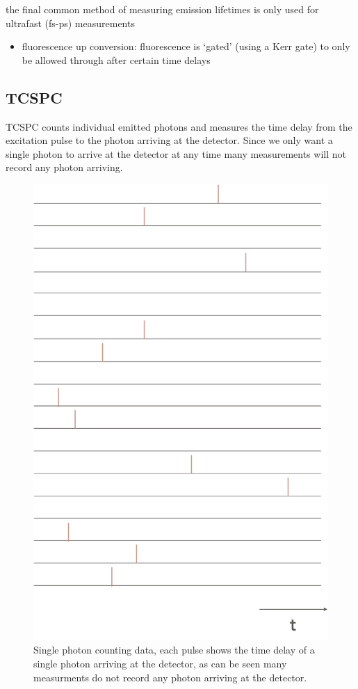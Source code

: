 \documentclass[
]{book}
\providecommand{\tightlist}{%
  \setlength{\itemsep}{0pt}\setlength{\parskip}{0pt}}
\begin{document}
the final common method of measuring emission lifetimes is only used for ultrafast (fs-ps) measurements

\begin{itemize}
\tightlist
\item
  fluorescence up conversion: fluorescence is `gated' (using a Kerr gate) to only be allowed through after certain time delays
\end{itemize}

\hypertarget{tcspc}{%
\subsection{TCSPC}\label{tcspc}}

TCSPC counts individual emitted photons and measures the time delay from the excitation pulse to the photon arriving at the detector. Since we only want a single photon to arrive at the detector at any time many measurements will not record any photon arriving.

\begin{figure}

{\centering \includegraphics[width=0.6\linewidth]{images/singlephoton} 

}

\caption{Single photon counting data, each pulse shows the time delay of a single photon arriving at the detector, as can be seen many measurments do not record any photon arriving at the detector.}\label{fig:singlephoton}
\end{figure}
\end{document}

